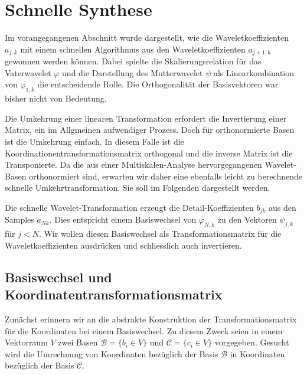 %
%
%
\section{Schnelle Synthese\label{section:schnelle-synthese}}
Im vorangegangenen Abschnitt wurde dargestellt, wie die Waveletkoeffizienten
$a_{j,k}$ mit einem schnellen Algorithmus aus den Waveletkoeffizienten
$a_{j+1,k}$ gewonnen werden können.
Dabei spielte die Skalierungsrelation für das Vaterwavelet $\varphi$ und die
Darstellung des Mutterwavelet $\psi$ als Linearkombination von $\varphi_{1,k}$
die entscheidende Rolle.
Die Orthogonalität der Basisvektoren war bisher nicht von Bedeutung.

Die Umkehrung einer linearen Transformation erfordert die
Invertierung einer Matrix, ein im Allgmeinen aufwendiger Prozess.
Doch für orthonormierte Basen ist die Umkehrung einfach.
In diesem Falle ist die Koordinationentransformationsmatrix
orthogonal und die inverse Matrix ist die Transponierte.
Da die aus einer Multiskalen-Analyse hervorgegangenen Wavelet-Basen
orthonormiert sind, erwarten wir daher eine ebenfalls leicht zu
berechnende schnelle Umkehrtransformation.
Sie soll im Folgenden dargestellt werden.

Die schnelle Wavelet-Transformation erzeugt die Detail-Koeffizienten
$b_{jk}$ aus den Samples $a_{Nk}$.
Dies entspricht einem Basiswechsel von $\varphi_{N,k}$ zu den
Vektoren $\psi_{j,k}$ für $j<N$.
Wir wollen diesen Basiswechsel als Transformationsmatrix für 
die Waveletkoeffizienten ausdrücken und schliesslich auch invertieren.

%
%
\subsection{Basiswechsel und Koordinatentransformationsmatrix}
Zunächst erinnern wir an die abstrakte Konstruktion der
Transformationsmatrix für die Koordinaten bei einem Basiswechsel.
Zu diesem Zweck seien in einem Vektorraum $V$ zwei Basen
$\mathcal{B}=\{b_i\in V\}$ und $\mathcal{C}=\{c_i\in V\}$ vorgegeben.
Gesucht wird die Umrechnung von Koordinaten bezüglich der Basis
$\mathcal{B}$ in Koordinaten bezüglich der Basis $\mathcal{C}$.

